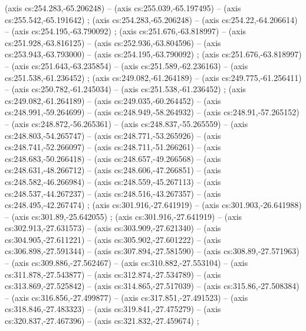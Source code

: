     (axis cs:254.283,-65.206248) --  (axis cs:255.039,-65.197495) --  (axis cs:255.542,-65.191642) ;
    (axis cs:254.283,-65.206248) --  (axis cs:254.22,-64.206614) --  (axis cs:254.195,-63.790092) ;
    (axis cs:251.676,-63.818997) --  (axis cs:251.928,-63.816125) --  (axis cs:252.936,-63.804596) --  (axis cs:253.943,-63.793000) --  (axis cs:254.195,-63.790092) ;
    (axis cs:251.676,-63.818997) --  (axis cs:251.643,-63.235854) --  (axis cs:251.589,-62.236163) --  (axis cs:251.538,-61.236452) ;
    (axis cs:249.082,-61.264189) --  (axis cs:249.775,-61.256411) --  (axis cs:250.782,-61.245034) --  (axis cs:251.538,-61.236452) ;
    (axis cs:249.082,-61.264189) --  (axis cs:249.035,-60.264452) --  (axis cs:248.991,-59.264699) --  (axis cs:248.949,-58.264932) --  (axis cs:248.91,-57.265152) --  (axis cs:248.872,-56.265361) --  (axis cs:248.837,-55.265559) --  (axis cs:248.803,-54.265747) --  (axis cs:248.771,-53.265926) --  (axis cs:248.741,-52.266097) --  (axis cs:248.711,-51.266261) --  (axis cs:248.683,-50.266418) --  (axis cs:248.657,-49.266568) --  (axis cs:248.631,-48.266712) --  (axis cs:248.606,-47.266851) --  (axis cs:248.582,-46.266984) --  (axis cs:248.559,-45.267113) --  (axis cs:248.537,-44.267237) --  (axis cs:248.516,-43.267357) --  (axis cs:248.495,-42.267474) ;
    (axis cs:301.916,-27.641919) --  (axis cs:301.903,-26.641988) --  (axis cs:301.89,-25.642055) ;
    (axis cs:301.916,-27.641919) --  (axis cs:302.913,-27.631573) --  (axis cs:303.909,-27.621340) --  (axis cs:304.905,-27.611221) --  (axis cs:305.902,-27.601222) --  (axis cs:306.898,-27.591344) --  (axis cs:307.894,-27.581590) --  (axis cs:308.89,-27.571963) --  (axis cs:309.886,-27.562467) --  (axis cs:310.882,-27.553104) --  (axis cs:311.878,-27.543877) --  (axis cs:312.874,-27.534789) --  (axis cs:313.869,-27.525842) --  (axis cs:314.865,-27.517039) --  (axis cs:315.86,-27.508384) --  (axis cs:316.856,-27.499877) --  (axis cs:317.851,-27.491523) --  (axis cs:318.846,-27.483323) --  (axis cs:319.841,-27.475279) --  (axis cs:320.837,-27.467396) --  (axis cs:321.832,-27.459674) ;
